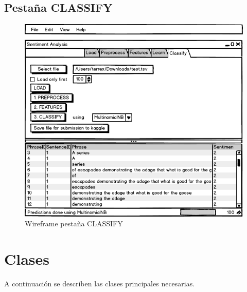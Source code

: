 \FloatBarrier
\newpage
\subsection{Pestaña CLASSIFY}

\begin{figure}[htbp]
\centering
\includegraphics[width=12cm,clip=true,trim=0 0 0 38pt]{gui-5-classify}
\caption{Wireframe pestaña CLASSIFY}
\label{fig:gui-5-classify}
\end{figure}


\section{Clases}

A continuación se describen las clases principales necesarias.

\subsection{}

\subsection{}

\subsection{}


